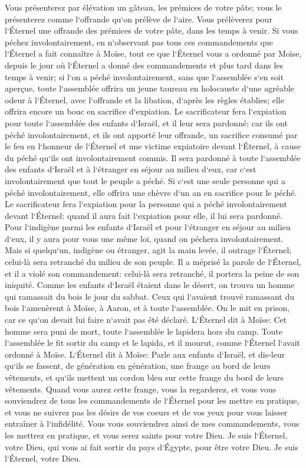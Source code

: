 \verse Vous présenterez par élévation un gâteau, les prémices de votre pâte; vous le présenterez comme l`offrande qu`on prélève de l`aire. 
\verse Vous prélèverez pour l`Éternel une offrande des prémices de votre pâte, dans les temps à venir. 
\verse Si vous péchez involontairement, en n`observant pas tous ces commandements que l`Éternel a fait connaître à Moïse, 
\verse tout ce que l`Éternel vous a ordonné par Moïse, depuis le jour où l`Éternel a donné des commandements et plus tard dans les temps à venir; 
\verse si l`on a péché involontairement, sans que l`assemblée s`en soit aperçue, toute l`assemblée offrira un jeune taureau en holocauste d`une agréable odeur à l`Éternel, avec l`offrande et la libation, d`après les règles établies; elle offrira encore un bouc en sacrifice d`expiation. 
\verse Le sacrificateur fera l`expiation pour toute l`assemblée des enfants d`Israël, et il leur sera pardonné; car ils ont péché involontairement, et ils ont apporté leur offrande, un sacrifice consumé par le feu en l`honneur de l`Éternel et une victime expiatoire devant l`Éternel, à cause du péché qu`ils ont involontairement commis. 
\verse Il sera pardonné à toute l`assemblée des enfants d`Israël et à l`étranger en séjour au milieu d`eux, car c`est involontairement que tout le peuple a péché. 
\verse Si c`est une seule personne qui a péché involontairement, elle offrira une chèvre d`un an en sacrifice pour le péché. 
\verse Le sacrificateur fera l`expiation pour la personne qui a péché involontairement devant l`Éternel: quand il aura fait l`expiation pour elle, il lui sera pardonné. 
\verse Pour l`indigène parmi les enfants d`Israël et pour l`étranger en séjour au milieu d`eux, il y aura pour vous une même loi, quand on péchera involontairement. 
\verse Mais si quelqu`un, indigène ou étranger, agit la main levée, il outrage l`Éternel; celui-là sera retranché du milieu de son peuple. 
\verse Il a méprisé la parole de l`Éternel, et il a violé son commandement: celui-là sera retranché, il portera la peine de son iniquité. 
\verse Comme les enfants d`Israël étaient dans le désert, on trouva un homme qui ramassait du bois le jour du sabbat. 
\verse Ceux qui l`avaient trouvé ramassant du bois l`amenèrent à Moïse, à Aaron, et à toute l`assemblée. 
\verse On le mit en prison, car ce qu`on devait lui faire n`avait pas été déclaré. 
\verse L`Éternel dit à Moïse: Cet homme sera puni de mort, toute l`assemblée le lapidera hors du camp. 
\verse Toute l`assemblée le fit sortir du camp et le lapida, et il mourut, comme l`Éternel l`avait ordonné à Moïse. 
\verse L`Éternel dit à Moïse: 
\verse Parle aux enfants d`Israël, et dis-leur qu`ils se fassent, de génération en génération, une frange au bord de leurs vêtements, et qu`ils mettent un cordon bleu sur cette frange du bord de leurs vêtements. 
\verse Quand vous aurez cette frange, vous la regarderez, et vous vous souviendrez de tous les commandements de l`Éternel pour les mettre en pratique, et vous ne suivrez pas les désirs de vos coeurs et de vos yeux pour vous laisser entraîner à l`infidélité. 
\verse Vous vous souviendrez ainsi de mes commandements, vous les mettrez en pratique, et vous serez saints pour votre Dieu. 
\verse Je suis l`Éternel, votre Dieu, qui vous ai fait sortir du pays d`Égypte, pour être votre Dieu. Je suis l`Éternel, votre Dieu. 

